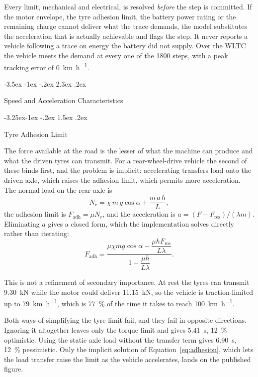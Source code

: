 \documentclass[twocolumn]{article}
\makeatletter
\renewcommand\section{\@startsection{section}{1}{\z@}%
  {-3.5ex \@plus -1ex \@minus -.2ex}%
  {2.3ex \@plus.2ex}%
  {\raggedright\normalfont\Large\bfseries}}
\renewcommand\subsection{\@startsection{subsection}{2}{\z@}%
  {-3.25ex\@plus -1ex \@minus -.2ex}%
  {1.5ex \@plus .2ex}%
  {\raggedright\normalfont\large\bfseries}}
\makeatother
\begin{document}
Every limit, mechanical and electrical, is resolved \emph{before} the step is
committed. If the motor envelope, the tyre adhesion limit, the battery power
rating or the remaining charge cannot deliver what the trace demands, the model
substitutes the acceleration that is actually achievable and flags the step. It
never reports a vehicle following a trace on energy the battery did not supply.
Over the WLTC the vehicle meets the demand at every one of the 1800 steps, with
a peak tracking error of \SI{0}{\kilo\metre\per\hour}.

\section{Speed and Acceleration Characteristics}
\label{sec:characteristics}

\subsection{Tyre Adhesion Limit}

The force available at the road is the lesser of what the machine can produce
and what the driven tyres can transmit. For a rear-wheel-drive vehicle the
second of these binds first, and the problem is implicit: accelerating
transfers load onto the driven axle, which raises the adhesion limit, which
permits more acceleration. The normal load on the rear axle is
\begin{equation}
N_r = \chi\, m\, g \cos\alpha + \frac{m\, a\, h}{L} ,
\end{equation}
the adhesion limit is $F_{\mathrm{adh}} = \mu N_r$, and the acceleration is
$a = (F - F_{\mathrm{res}})/(\lambda m)$. Eliminating $a$ gives a closed form,
which the implementation solves directly rather than iterating:
\begin{equation}
F_{\mathrm{adh}} =
\frac{\mu \chi m g \cos\alpha - \dfrac{\mu h F_{\mathrm{res}}}{L \lambda}}
     {1 - \dfrac{\mu h}{L \lambda}} .
\label{eq:adhesion}
\end{equation}

This is not a refinement of secondary importance. At rest the tyres can
transmit \SI{9.30}{\kilo\newton} while the motor could deliver
\SI{11.15}{\kilo\newton}, so the vehicle is traction-limited up to
\SI{79}{\kilo\metre\per\hour}, which is \SI{77}{\percent} of the time it
takes to reach \SI{100}{\kilo\metre\per\hour}.

Both ways of simplifying the tyre limit fail, and they fail in opposite
directions. Ignoring it altogether leaves only the torque limit and gives
\SI{5.41}{\second}, \SI{12}{\percent} optimistic. Using the static axle load
without the transfer term gives \SI{6.90}{\second}, \SI{12}{\percent}
pessimistic. Only the implicit solution of Equation~\ref{eq:adhesion}, which
lets the load transfer raise the limit as the vehicle accelerates, lands on the
published figure.
\end{document}
